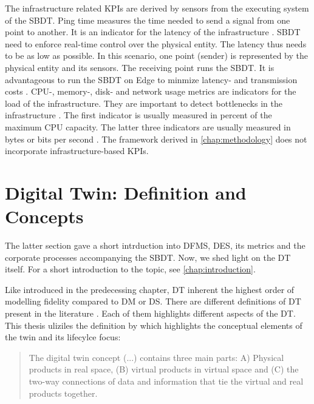 The infrastructure related KPIs are derived by sensors from the executing system of the SBDT. Ping time measures the time needed to send a signal from one point to another. It is an indicator for the latency of the infrastructure \autocite{wu2021digital}. SBDT need to enforce real-time control over the physical entity. The latency thus needs to be as low as possible. In this scenario, one point (sender) is represented by the physical entity and its sensors. The receiving point runs the SBDT. It is advantageous to run the SBDT on Edge to minmize latency- and transmission costs \autocite{li2018learning}. CPU-, memory-, disk- and network usage metrics are indicators for the load of the infrastructure. They are important to detect bottlenecks in the infrastructure \autocite{li2018learning}. The first indicator is usually measured in percent of the maximum CPU capacity. The latter three indicators are usually measured in bytes or bits per second \autocite{granelli2021evaluating}. The framework derived in \autoref{chap:methodology} does not incorporate infrastructure-based KPIs.


\section{Digital Twin: Definition and Concepts}
\label{sec:digital-twin}
The latter section gave a short intrduction into DFMS, DES, its metrics and the corporate processes accompanying the SBDT. Now, we shed light on the DT itself. For a short introduction to the topic, see \autoref{chap:introduction}.

Like introduced in the predecessing chapter, DT inherent the highest order of modelling fidelity compared to DM or DS. There are different definitions of DT present in the literature \autocite{Negri2017promfg,zheng2019application,glaessgen2012digital,Demkovich2018def,boschert2016digital,grieves2014digital,kritzinger2018digital,Tao2018ijamt,zehnder2018representing}. Each of them highlights different aspects of the DT. This thesis uliziles the definition by \autocite{grieves2014digital} which highlights the conceptual elements of the twin and its lifecylce focus:

\begin{quote}
  The digital twin concept (...) contains three main parts: A) Physical products in real space, (B) virtual products in virtual space and (C) the two-way connections of data and information that tie the virtual and real products together. \autocite{grieves2014digital}
\end{quote}

